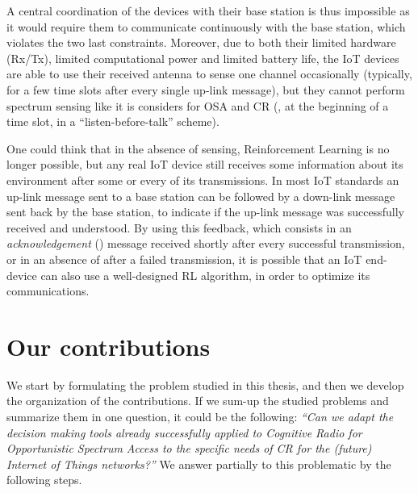 A central coordination of the devices with their base station is thus impossible as it would require them to communicate continuously with the base station, which violates the two last constraints.
%
Moreover, due to both their limited hardware (Rx/Tx), limited computational power and limited battery life, the IoT devices are able to use their received antenna to sense one channel occasionally (typically, for a few time slots after every single up-link message), but they cannot perform spectrum sensing like it is considers for OSA and CR (\ie, at the beginning of a time slot, in a ``listen-before-talk'' scheme).

One could think that in the absence of sensing, Reinforcement Learning is no longer possible, but any real IoT device still receives some information about its environment after some or every of its transmissions.
In most IoT standards an up-link message sent to a base station can be followed by a down-link message sent back by the base station, to indicate if the up-link message was successfully received and understood.
%
By using this feedback, which consists in an \emph{acknowledgement} (\Ack) message received shortly after every successful transmission, or in an absence of \Ack{} after a failed transmission, it is possible that an IoT end-device can also use a well-designed RL algorithm, in order to optimize its communications.
%


\section{Our contributions}
\label{sec:1:contributions}

We start by formulating the problem studied in this thesis, and then we develop the organization of the contributions.
%
%
If we sum-up the studied problems and summarize them in one question, it could be the following:
\emph{``Can we adapt the decision making tools already successfully applied to Cognitive Radio for Opportunistic Spectrum Access to the specific needs of CR for the (future) Internet of Things networks?''}
%
We answer partially to this problematic by the following steps.


